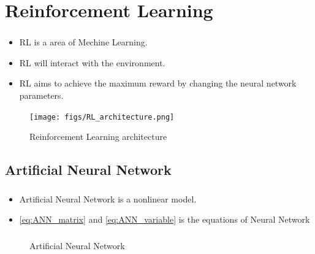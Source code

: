 \documentclass{beamer}
\begin{document}
    \section{Reinforcement Learning}
    \begin{frame}
        \frametitle{\secname}

        \begin{itemize}
            \item RL is a area of Mechine Learning.
            \item RL will interact with the environment.
            \item RL aims to achieve the maximum reward by changing the neural network parameters.
            
        \end{itemize}

        \begin{figure}
            \centering
            \texttt{[image: figs/RL\_architecture.png]}
            \caption{Reinforcement Learning architecture\cite{Flight_Controller_Synthesis_Via_Deep_Reinforcement_Learning}}
        \end{figure}

    \end{frame}

    \subsection*{Artificial Neural Network}
    \begin{frame}
        \frametitle{\subsecname}

        \begin{itemize}
            \item Artificial Neural Network is a nonlinear model.
            \item \eqref{eq:ANN_matrix} and \eqref{eq:ANN_variable} is the equations of Neural Network
        \end{itemize}

        
        

    \end{frame}

    \begin{frame}
        \frametitle{\subsecname}

        \begin{figure}
            \centering
            \scalebox{.7}{}
            \caption{Artificial Neural Network}
        \end{figure}

    \end{frame}
\end{document}
